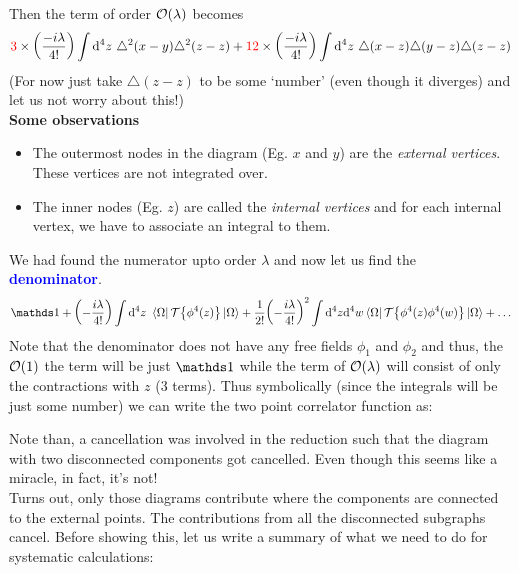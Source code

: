 \noindent
Then the term of order $\mathcal O(\lambda)$ becomes $$\mathcolor{red}{3}\times\qty(\frac{-i\lambda}{4!})\int \dd^4 z \ \triangle^2(x-y) \triangle^2(z-z)+\mathcolor{red}{12}\times\qty(\frac{-i\lambda}{4!})\int \dd^4 z \ \triangle(x-z)\triangle(y-z) \triangle(z-z) $$
(For now just take $\triangle(z-z)$ to be some `number' (even though it diverges) and let us not worry about this!)\\[0.2cm]
     \textbf{Some observations}
     \begin{itemize}[label=$\vartriangleright$]
      \item The outermost nodes in the diagram (Eg. $x$ and $y$) are the \textit{external vertices}. These vertices are not integrated over.
      \item The inner nodes (Eg. $z$) are called the \textit{internal vertices} and for each internal vertex, we have to associate an integral to them.
     \end{itemize}
We had found the numerator upto order $\lambda$ and now let us find the \textbf{\textcolor{blue}{denominator}}.
$$\iden + \qty(-\frac{i\lambda}{4!})\int \dd^4 z \ \vacb\ST\qty{ \phi^4(z)}\vac + \frac{1}{2!}\qty(-\frac{i\lambda}{4!})^2\int \dd^4 z \dd^4 w \vacb \ST\qty{ \phi^4(z)\phi^4(w)}\vac+ \ldots$$
Note that the denominator does not have any free fields $\phi_1$ and $\phi_2$ and thus, the $\mathcal O(1)$ the term will be just $\iden$ while the term of $\mathcal O(\lambda)$ will consist of only the contractions with $z$ (3 terms). Thus symbolically (since the integrals will be just some number) we can write the two point correlator function as: 
\begin{figure}[H]
  \centering 
  
\end{figure}
\noindent
Note than, a cancellation was involved in the reduction such that the diagram with two disconnected components got cancelled. Even though this seems like a miracle, in fact, it's not!\\[0.2cm]
Turns out, only those diagrams contribute where the components are connected to the external points. The contributions from all the disconnected subgraphs cancel. Before showing this, let us write a summary of what we need to do for systematic calculations:
